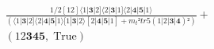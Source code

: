 \documentclass[varwidth, border=5pt]{standalone}
\begin{document}
\begin{my}
$\begin{gathered}
\scriptscriptstyle\frac{1/2[12]⟨1|𝟑|2]⟨2|𝟑|1]⟨2|𝟒|𝟓|1⟩}{(⟨1|𝟑|2]⟨2|𝟒|𝟓|1⟩[1|𝟑|2⟩[2|𝟒|𝟓|1]+m_t²tr5(1|2|𝟑|𝟒)²)} +\\
\scriptscriptstyle(12𝟑𝟒𝟓,\;\text{True}) \phantom{+}
\end{gathered}$
\end{my}
\end{document}

